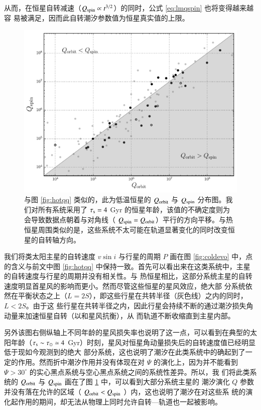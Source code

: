 从而，在恒星自转减速（$Q_\mathrm{spin} \propto t^{3/2}$）的同时，公式 \ref{eq:lmqspin} 也将变得越来越容
易被满足，因而此自转潮汐参数值为恒星真实值的上限。

\begin{figure}[t]
\centering
\includegraphics[width=1.0\textwidth]{figures/chapter4/fig10b_cold.pdf}
\caption{与图 \ref{fig:hotqq} 类似的，此为低温恒星的 $Q_\mathrm{orbit}$ 与 $Q_\mathrm{spin}$ 分布图。我们对所有系统采用了 $\tau_\mathrm{s} = 4$ Gyr 的恒星年龄，该值的不确定度则为会导致数据点朝着与对角线（ $Q_\mathrm{spin} = Q_\mathrm{orbit}$）平行的方向平移。与热恒星周围类似的是，这些系统不太可能在轨道显著变化的同时改变恒星的自转轴方向。} 
\label{fig:coldqq}
\end{figure}


我们将类太阳主星的自转速度 $v\sin i$ 与行星的周期 $P$ 画在图 \ref{fig:coldevo} 中，点的含义与前文中图 \ref{fig:hotqq} 中保持一致。首先可以看出来在这类系统中，主星的自转速度与行星的周期并没有相关性。与
热恒星相比，这部分系统主星的自转速度明显首星风的影响而更小。然而尽管这些恒星的星风效应，绝大部
分系统依然在平衡状态之上（$L=2S$），即这些行星在共转半径（灰色线）之内的同时，$L<2S$。由于这
些行星在共转半径之内，因此行星会持续不断的通过潮汐损失角动量来加速恒星自转（以和星风抗衡），从
而轨道不断收缩直到主星内部。

另外该图右侧纵轴上不同年龄的星风损失率也说明了这一点，可以看到在典型的太阳年龄（$\tau_\mathrm{s} \sim 
\tau_\odot \simeq 4 $ Gyr）时刻，星风对恒星角动量损失后的自转速度值已经明显低于现如今观测到的绝大
部分系统，这也说明了潮汐在此类系统中的确起到了一定的作用。然而折中潮汐作用并没有体现在对 $\Psi$
的演化上，因为并不能看到 $\Psi > 30^\circ$ 的实心黑点系统与空心黑点系统之间的系统性差异。所以，我
们将此类系统的 $Q_\mathrm{orbit}$ 与 $Q_\mathrm{spin}$  画在了图 \ref{fig:coldqq} 中，可以看到大部分系统主星的
潮汐演化 $Q$ 参数并没有落在允许的区域（ $Q_\mathrm{orbit} < Q_\mathrm{spin}$ ）内，这也说明了潮汐在对这些系
统的演化起作用的期间，却无法从物理上同时允许自转---轨道也一起被影响。

